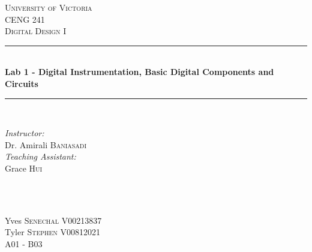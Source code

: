 \documentclass[11pt]{article}
\newcommand{\HRule}{\rule{\linewidth}{0.5mm}}
\begin{document}

\begin{titlepage}

\center
 
\textsc{\LARGE University of Victoria}\\[1cm] 	%
\textsc{\Large CENG 241}\\[0.5cm] 			%
\textsc{\large Digital Design I}\\[0.5cm] 		%


\HRule \\[0.4cm]
{ \huge \bfseries Lab 1 - Digital Instrumentation, Basic Digital Components and Circuits}\\[0.2cm] %
\HRule \\[1.5cm]
 
 
\begin{minipage}{0.7\textwidth}
\begin{flushleft} 

\large\emph{Instructor:} \\
Dr. Amirali \textsc{Baniasadi} \\
\vspace{12 pt}
\emph{Teaching Assistant:} \\
Grace \textsc{Hui}

\end{flushleft}
\end{minipage}
~
\begin{minipage}{0.1\textwidth}
\begin{flushright} \large
\vspace{12 pt}
\end{flushright}
\end{minipage}\\[2cm]


\Large Yves \textsc{Senechal}
\large V00213837	\\
\Large Tyler \textsc{Stephen}
\large V00812021	\\
A01 - B03\\[1.5cm] 



\end{titlepage}
\end{document}

